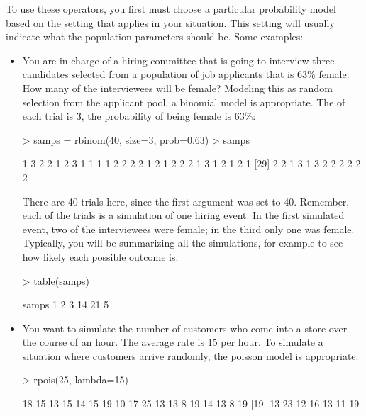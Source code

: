 To use these operators, you first must choose a particular probability
model based on the setting that applies in your situation.  This
setting will usually indicate what the population parameters should
be.  Some examples:
\begin{itemize}

\item You are in charge of a hiring committee 
that is  going to interview three candidates selected from a
population of job applicants that is 63\% female.  How many of the
interviewees will be female?  Modeling this as random selection from
the applicant pool, a binomial model is appropriate.  The 
of each trial is 3, the probability of being female is 63\%:
\begin{Schunk}
\begin{Sinput}
> samps = rbinom(40, size=3, prob=0.63)
> samps
\end{Sinput}
\begin{Soutput}
 [1] 1 3 2 2 1 2 3 1 1 1 1 2 2 2 2 1 2 1 2 2 2 1 3 1 2 1 2 1
[29] 2 2 1 3 1 3 2 2 2 2 2 2
\end{Soutput}
\end{Schunk}
There are 40 trials here, since the first argument was set to 40.
Remember, each of the trials is a simulation of one hiring event.  In
the first simulated event, two of the interviewees were female; in the
third only one was female.  Typically, you will be summarizing all the
simulations, for example to see how likely each possible outcome is.
\begin{Schunk}
\begin{Sinput}
> table(samps)
\end{Sinput}
\begin{Soutput}
samps
 1  2  3 
14 21  5 
\end{Soutput}
\end{Schunk}

\item You want to simulate the number of customers who come into a
store over the course of an hour.  The average rate is 15 per hour.
To simulate a situation where customers arrive randomly, the poisson
model is appropriate:
\begin{Schunk}
\begin{Sinput}
> rpois(25, lambda=15)
\end{Sinput}
\begin{Soutput}
 [1] 18 15 13 15 14 15 19 10 17 25 13 13  8 19 14 13  8 19
[19] 13 23 12 16 13 11 19
\end{Soutput}
\end{Schunk}


\end{itemize}
